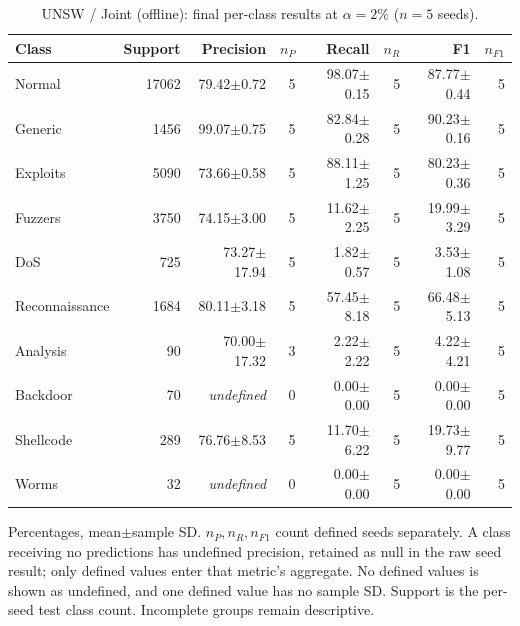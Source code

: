 \begin{table}[t]
\centering\scriptsize
\setlength{\tabcolsep}{3.3pt}
\caption{UNSW / Joint (offline): final per-class results at $\alpha=2\%$ ($n=5$ seeds).}\label{tab:forgetting-class-unsw_nb15-joint}
\begin{tabular}{lrrrrrrr}
\toprule
Class & Support & Precision & $n_P$ & Recall & $n_R$ & F1 & $n_{F1}$ \\
\midrule
Normal & 17062 & 79.42$\pm$0.72 & 5 & 98.07$\pm$0.15 & 5 & 87.77$\pm$0.44 & 5 \\
Generic & 1456 & 99.07$\pm$0.75 & 5 & 82.84$\pm$0.28 & 5 & 90.23$\pm$0.16 & 5 \\
Exploits & 5090 & 73.66$\pm$0.58 & 5 & 88.11$\pm$1.25 & 5 & 80.23$\pm$0.36 & 5 \\
Fuzzers & 3750 & 74.15$\pm$3.00 & 5 & 11.62$\pm$2.25 & 5 & 19.99$\pm$3.29 & 5 \\
DoS & 725 & 73.27$\pm$17.94 & 5 & 1.82$\pm$0.57 & 5 & 3.53$\pm$1.08 & 5 \\
Reconnaissance & 1684 & 80.11$\pm$3.18 & 5 & 57.45$\pm$8.18 & 5 & 66.48$\pm$5.13 & 5 \\
Analysis & 90 & 70.00$\pm$17.32 & 3 & 2.22$\pm$2.22 & 5 & 4.22$\pm$4.21 & 5 \\
Backdoor & 70 & \textit{undefined} & 0 & 0.00$\pm$0.00 & 5 & 0.00$\pm$0.00 & 5 \\
Shellcode & 289 & 76.76$\pm$8.53 & 5 & 11.70$\pm$6.22 & 5 & 19.73$\pm$9.77 & 5 \\
Worms & 32 & \textit{undefined} & 0 & 0.00$\pm$0.00 & 5 & 0.00$\pm$0.00 & 5 \\
\bottomrule
\end{tabular}
\par\smallskip\begin{minipage}{0.98\textwidth}\scriptsize Percentages, mean$\pm$sample SD. $n_P,n_R,n_{F1}$ count defined seeds separately. A class receiving no predictions has undefined precision, retained as null in the raw seed result; only defined values enter that metric's aggregate. No defined values is shown as undefined, and one defined value has no sample SD. Support is the per-seed test class count. Incomplete groups remain descriptive.\end{minipage}
\end{table}

